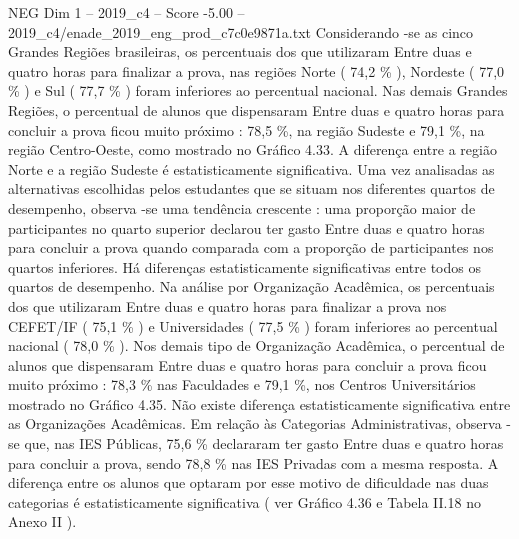 \begin{textsample}{NEG Dim 1 – 2019\_c4 – Score -5.00 – 2019\_c4/enade\_2019\_eng\_prod\_c7c0e9871a.txt}
Considerando -se as cinco Grandes Regiões brasileiras, os percentuais dos que utilizaram Entre duas e quatro horas para finalizar a prova, nas regiões Norte ( 74,2 \% ), Nordeste ( 77,0 \% ) e Sul ( 77,7 \% ) foram inferiores ao percentual nacional.
Nas demais Grandes Regiões, o percentual de alunos que dispensaram Entre duas e quatro horas para concluir a prova ficou muito próximo : 78,5 \%, na região Sudeste e 79,1 \%, na região Centro-Oeste, como mostrado no Gráfico 4.33.
A diferença entre a região Norte e a região Sudeste é estatisticamente significativa.
Uma vez analisadas as alternativas escolhidas pelos estudantes que se situam nos diferentes quartos de desempenho, observa -se uma tendência crescente : uma proporção maior de participantes no quarto superior declarou ter gasto Entre duas e quatro horas para concluir a prova quando comparada com a proporção de participantes nos quartos inferiores.
Há diferenças estatisticamente significativas entre todos os quartos de desempenho.
Na análise por Organização Acadêmica, os percentuais dos que utilizaram Entre duas e quatro horas para finalizar a prova nos CEFET/IF ( 75,1 \% ) e Universidades ( 77,5 \% ) foram inferiores ao percentual nacional ( 78,0 \% ).
Nos demais tipo de Organização Acadêmica, o percentual de alunos que dispensaram Entre duas e quatro horas para concluir a prova ficou muito próximo : 78,3 \% nas Faculdades e 79,1 \%, nos Centros Universitários mostrado no Gráfico 4.35.
Não existe diferença estatisticamente significativa entre as Organizações Acadêmicas.
Em relação às Categorias Administrativas, observa -se que, nas IES Públicas, 75,6 \% declararam ter gasto Entre duas e quatro horas para concluir a prova, sendo 78,8 \% nas IES Privadas com a mesma resposta.
A diferença entre os alunos que optaram por esse motivo de dificuldade nas duas categorias é estatisticamente significativa ( ver Gráfico 4.36 e Tabela II.18 no Anexo II ).

\end{textsample}
